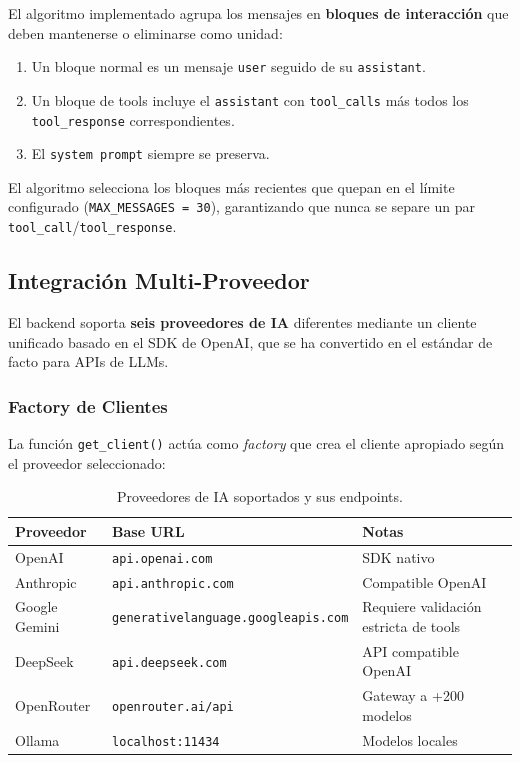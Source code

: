 El algoritmo implementado agrupa los mensajes en \textbf{bloques de interacción} que deben mantenerse o eliminarse como unidad:

\begin{enumerate}
    \item Un bloque normal es un mensaje \texttt{user} seguido de su \texttt{assistant}.
    \item Un bloque de tools incluye el \texttt{assistant} con \texttt{tool\_calls} más todos los \texttt{tool\_response} correspondientes.
    \item El \texttt{system prompt} siempre se preserva.
\end{enumerate}

El algoritmo selecciona los bloques más recientes que quepan en el límite configurado (\texttt{MAX\_MESSAGES = 30}), garantizando que nunca se separe un par \texttt{tool\_call}/\texttt{tool\_response}.

\subsection{Integración Multi-Proveedor}

El backend soporta \textbf{seis proveedores de IA} diferentes mediante un cliente unificado basado en el SDK de OpenAI, que se ha convertido en el estándar de facto para APIs de LLMs.

\subsubsection{Factory de Clientes}

La función \texttt{get\_client()} actúa como \textit{factory} que crea el cliente apropiado según el proveedor seleccionado:

\begin{table}[H]
\centering
\renewcommand{\arraystretch}{1.2}
\begin{tabular}{|l|l|p{5cm}|}
\hline
\rowcolor[gray]{0.85}
\textbf{Proveedor} & \textbf{Base URL} & \textbf{Notas} \\
\hline
OpenAI & \texttt{api.openai.com} & SDK nativo \\
\hline
Anthropic & \texttt{api.anthropic.com} & Compatible OpenAI \\
\hline
Google Gemini & \texttt{generativelanguage.googleapis.com} & Requiere validación estricta de tools \\
\hline
DeepSeek & \texttt{api.deepseek.com} & API compatible OpenAI \\
\hline
OpenRouter & \texttt{openrouter.ai/api} & Gateway a +200 modelos \\
\hline
Ollama & \texttt{localhost:11434} & Modelos locales \\
\hline
\end{tabular}
\caption{Proveedores de IA soportados y sus endpoints.}
\label{tab:proveedores_ia}
\end{table}

